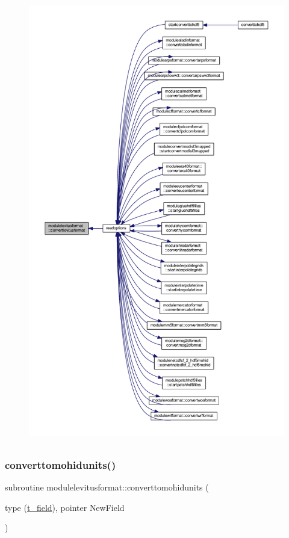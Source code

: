 \begin{figure}[H]
\begin{center}
\leavevmode
\includegraphics[height=550pt]{namespacemodulelevitusformat_a7849fb124c87ab2b4867b47c45ae92db_icgraph}
\end{center}
\end{figure}
\mbox{\label{namespacemodulelevitusformat_a9df551d282255b0ecad476a5078996da}} 
\subsubsection{\texorpdfstring{converttomohidunits()}{converttomohidunits()}}
{\footnotesize\ttfamily subroutine modulelevitusformat\+::converttomohidunits (\begin{DoxyParamCaption}\item[{type (\mbox{\hyperlink{structmodulelevitusformat_1_1t__field}{t\+\_\+field}}), pointer}]{New\+Field }\end{DoxyParamCaption})\hspace{0.3cm}{\ttfamily [private]}}

